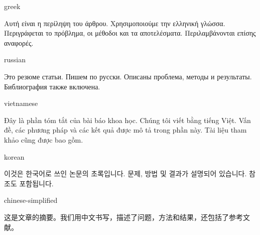 \documentclass[balance,upint,subscriptcorrection,varvw,mathalfa=cal=boondoxo,spanish,french,vietnamese,russian,greek,pdf-a,colorlinks]{asmeconf}
\begin{document}
\iffontspecloaded %
%
    \begin{selectlanguage}{greek}%
    \begin{abstract*}
    Αυτή είναι η περίληψη του άρθρου. Χρησιμοποιούμε την ελληνική γλώσσα. Περιγράφεται το πρόβλημα, οι μέθοδοι και τα αποτελέσματα. Περιλαμβάνονται επίσης αναφορές.
    \end{abstract*}
    \end{selectlanguage}%
%    
    \begin{selectlanguage}{russian}
    \begin{abstract*}
    Это резюме статьи. Пишем по русски. Описаны проблема, методы и результаты. Библиография также включена.%
    \end{abstract*}
    \end{selectlanguage}%
%
    \begin{selectlanguage}{vietnamese}
    \begin{abstract*}
    Đây là phần tóm tắt của bài báo khoa học. Chúng tôi viết bằng tiếng Việt. Vấn đề, các phương pháp và các kết quả được mô tả trong phần này. Tài liệu tham khảo cũng được bao gồm.
    \end{abstract*}
    \end{selectlanguage}%
%
%
    \begin{selectlanguage}{korean}
    \begin{abstract*}
    이것은 한국어로 쓰인 논문의 초록입니다. 문제, 방법 및 결과가 설명되어 있습니다. 참조도 포함됩니다.
    \end{abstract*}
    \end{selectlanguage}%
%
    \begin{selectlanguage}{chinese-simplified}
    \begin{abstract*}
    这是文章的摘要。我们用中文书写，描述了问题，方法和结果，还包括了参考文献。
    \end{abstract*}
    \end{selectlanguage}%
%
\fi

\end{document}

